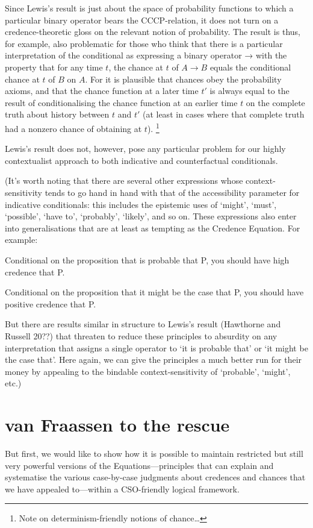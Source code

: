 \documentclass[If.tex]{subfiles}
\begin{document}
Since Lewis's result is just about the space of probability functions to which a particular binary operator bears the CCCP-relation, it does not turn on a credence-theoretic gloss on the relevant notion of probability. The result is thus, for example, also problematic for those who think that there is a particular interpretation of the conditional as expressing a binary operator → with the property that for any time $t$, the chance at $t$ of $A→B$ equals the conditional chance at $t$ of $B$ on $A$. For it is plausible that chances obey the probability axioms, and that the chance function at a later time $t'$ is always equal to the result of conditionalising the chance function at an earlier time $t$ on the complete truth about history between $t$ and $t'$ (at least in cases where that complete truth had a nonzero chance of obtaining at $t$).%
\footnote{Note on determinism-friendly notions of chance\ldots{}}

Lewis's result does not, however, pose any particular problem for our highly contextualist approach to both indicative and counterfactual conditionals. 


(It's worth noting that there are several other expressions whose context-sensitivity tends to go hand in hand with that of the accessibility parameter for indicative conditionals: this includes the epistemic uses of ‘might’, ‘must’, ‘possible’, ‘have to’, ‘probably’, ‘likely’, and so on. These expressions also enter into generalisations that are at least as tempting as the Credence Equation. For example:
\begin{prop}
	\item
	Conditional on the proposition that is probable that P, you should have high credence that P.
	\item
	Conditional on the proposition that it might be the case that P, you should have positive credence that P.
\end{prop}
But there are results similar in structure to Lewis's result (Hawthorne and Russell 20??) that threaten to reduce these principles to absurdity on any interpretation that assigns a single operator to ‘it is probable that’ or ‘it might be the case that’. Here again, we can give the principles a much better run for their money by appealing to the bindable context-sensitivity of ‘probable’, ‘might’, etc.)

\section{van Fraassen to the rescue}
But first, we would like to show how it is possible to maintain restricted but still very powerful versions of the Equations---principles that can explain and systematise the various case-by-case judgments about credences and chances that we have appealed to---within a CSO-friendly logical framework.
\end{document}
